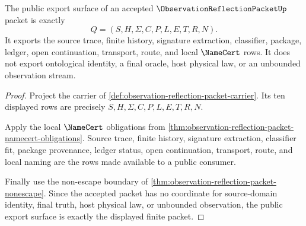 \begin{theorem}
\label{thm:observation-reflection-packet-public-export-surface}
The public export surface of an accepted $\ObservationReflectionPacketUp$ packet is exactly
$$
Q=(S,H,\Sigma,C,P,L,E,T,R,N).
$$
It exports the source trace, finite history, signature extraction, classifier, package, ledger, open continuation, transport, route, and local $\NameCert$ rows. It does not export ontological identity, a final oracle, host physical law, or an unbounded observation stream.
\end{theorem}
\begin{proof}
Project the carrier of \autoref{def:observation-reflection-packet-carrier}. Its ten displayed rows are precisely $S,H,\Sigma,C,P,L,E,T,R,N$.

Apply the local $\NameCert$ obligations from \autoref{thm:observation-reflection-packet-namecert-obligations}. Source trace, finite history, signature extraction, classifier fit, package provenance, ledger status, open continuation, transport, route, and local naming are the rows made available to a public consumer.

Finally use the non-escape boundary of \autoref{thm:observation-reflection-packet-nonescape}. Since the accepted packet has no coordinate for source-domain identity, final truth, host physical law, or unbounded observation, the public export surface is exactly the displayed finite packet.
\end{proof}



